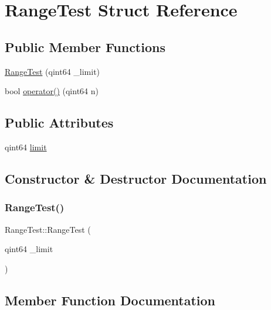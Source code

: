 \hypertarget{struct_range_test}{}\section{Range\+Test Struct Reference}
\label{struct_range_test}
\subsection*{Public Member Functions}
\begin{DoxyCompactItemize}
\item 
\mbox{\hyperlink{struct_range_test_a9d96f82c111ffd4d2747416b90306791}{Range\+Test}} (qint64 \+\_\+limit)
\item 
bool \mbox{\hyperlink{struct_range_test_add496768a566e04219e840ee25e829d7}{operator()}} (qint64 n)
\end{DoxyCompactItemize}
\subsection*{Public Attributes}
\begin{DoxyCompactItemize}
\item 
qint64 \mbox{\hyperlink{struct_range_test_a638ebd61c0447db219f10cd1473ab364}{limit}}
\end{DoxyCompactItemize}


\subsection{Constructor \& Destructor Documentation}
\mbox{\label{struct_range_test_a9d96f82c111ffd4d2747416b90306791}} 
\subsubsection{\texorpdfstring{Range\+Test()}{RangeTest()}}
{\footnotesize\ttfamily Range\+Test\+::\+Range\+Test (\begin{DoxyParamCaption}\item[{qint64}]{\+\_\+limit }\end{DoxyParamCaption})\hspace{0.3cm}{\ttfamily [inline]}}



\subsection{Member Function Documentation}
\mbox{\label{struct_range_test_add496768a566e04219e840ee25e829d7}} 
